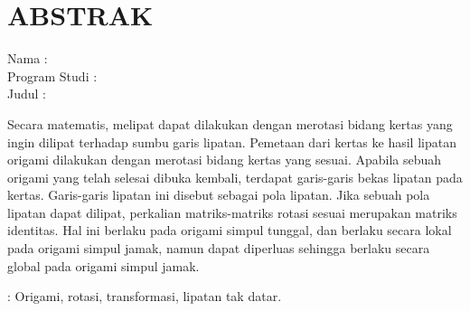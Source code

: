 %
%
%

\chapter*{\normalsize ABSTRAK}
\begin{singlespace}
\vspace*{0.2cm}

\noindent
Nama : \penulis \\ %
Program Studi : \jenjang~\bidang \\ %
Judul : \judul \\ %


\vspace*{0.5cm}

\noindent Secara matematis, melipat dapat dilakukan dengan merotasi bidang kertas yang ingin dilipat terhadap sumbu garis lipatan. Pemetaan dari kertas ke hasil lipatan origami dilakukan dengan merotasi bidang kertas yang sesuai. Apabila sebuah origami yang telah selesai dibuka kembali, terdapat garis-garis bekas lipatan pada kertas. Garis-garis lipatan ini disebut sebagai pola lipatan. Jika sebuah pola lipatan dapat dilipat, perkalian matriks-matriks rotasi sesuai merupakan matriks identitas. Hal ini berlaku pada origami simpul tunggal, dan berlaku secara lokal pada origami simpul jamak, namun dapat diperluas sehingga berlaku secara global pada origami simpul jamak.

\bigskip

\noindent \lipsum[1]

\vspace*{0.5cm}

\noindent {}: Origami, rotasi, transformasi, lipatan tak datar. \\ %
\end{singlespace}
\newpage 